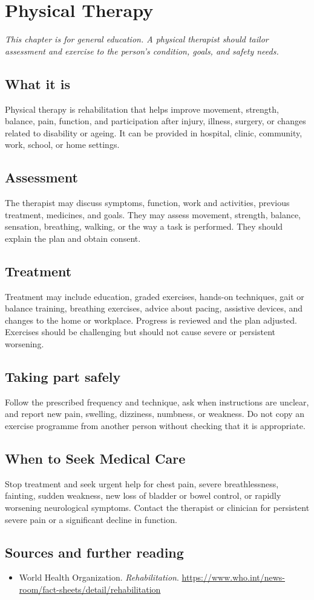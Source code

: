 \chapter{Physical Therapy}

\medskip
\noindent\textit{This chapter is for general education. A physical therapist should tailor assessment and exercise to the person’s condition, goals, and safety needs.}

\section*{What it is}
Physical therapy is rehabilitation that helps improve movement, strength, balance, pain, function, and participation after injury, illness, surgery, or changes related to disability or ageing. It can be provided in hospital, clinic, community, work, school, or home settings.

\section*{Assessment}
The therapist may discuss symptoms, function, work and activities, previous treatment, medicines, and goals. They may assess movement, strength, balance, sensation, breathing, walking, or the way a task is performed. They should explain the plan and obtain consent.

\section*{Treatment}
Treatment may include education, graded exercises, hands-on techniques, gait or balance training, breathing exercises, advice about pacing, assistive devices, and changes to the home or workplace. Progress is reviewed and the plan adjusted. Exercises should be challenging but should not cause severe or persistent worsening.

\section*{Taking part safely}
Follow the prescribed frequency and technique, ask when instructions are unclear, and report new pain, swelling, dizziness, numbness, or weakness. Do not copy an exercise programme from another person without checking that it is appropriate.

\section*{When to Seek Medical Care}
Stop treatment and seek urgent help for chest pain, severe breathlessness, fainting, sudden weakness, new loss of bladder or bowel control, or rapidly worsening neurological symptoms. Contact the therapist or clinician for persistent severe pain or a significant decline in function.

\section*{Sources and further reading}
\begin{itemize}
\item World Health Organization. \textit{Rehabilitation}. \url{https://www.who.int/news-room/fact-sheets/detail/rehabilitation}
\end{itemize}
